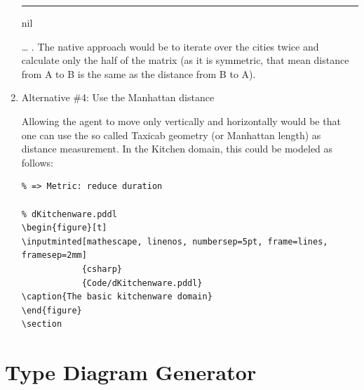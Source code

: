 \documentclass[11pt]{report}
\begin{document}
\begin{enumerate}
\begin{center}
{\begin{minipage}[c]{.6\textwidth}
\rule[.8em]{\textwidth}{2pt}

nil\end{minipage}
}
\end{center}
\ldots{} . The native approach would be to iterate over the cities twice
and calculate only the half of the matrix (as it is symmetric, that
mean distance from A to B is the same as the distance from B to A).

\item Alternative \#4: Use the Manhattan distance
\label{sec-4-3-3-4}

Allowing the agent to move only vertically and horizontally would be
that one can use the so called Taxicab geometry (or Manhattan length)
as distance measurement.  In the Kitchen domain, this could be modeled
as follows:

\begin{verbatim}
% => Metric: reduce duration

% dKitchenware.pddl 
\begin{figure}[t]
\inputminted[mathescape, linenos, numbersep=5pt, frame=lines, framesep=2mm]
            {csharp}
            {Code/dKitchenware.pddl}
\caption{The basic kitchenware domain}
\end{figure}
\section
\end{verbatim}

\begin{center}
\end{center}
\end{enumerate}
\section{Type Diagram Generator}
\label{sec-4-4}
\begin{center}
\end{center}
\end{document}
